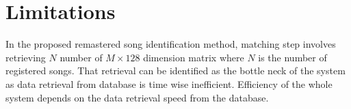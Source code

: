 \section{Limitations}

In the proposed remastered song identification method, matching step involves retrieving
\(N\) number of \(M\times128\) dimension matrix where \(N\) is the number of registered songs.
That retrieval can be identified as the bottle neck of the system as data retrieval from database
is time wise inefficient. Efficiency of the whole system depends on the data retrieval speed from
the database. 